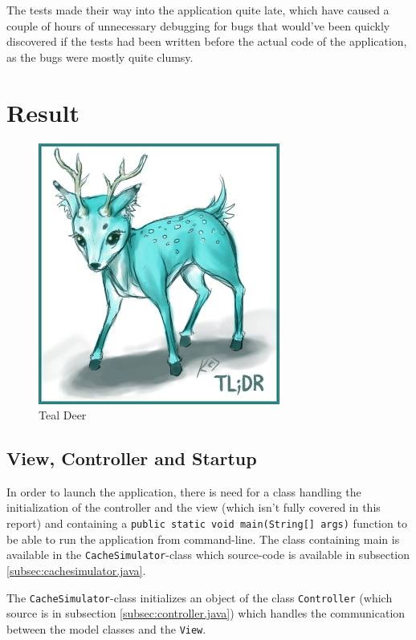 \documentclass[a4paper]{scrreprt}
\begin{document}
The tests made their way into the application quite late, which have caused a couple of hours of unnecessary debugging for bugs that would've been quickly discovered if the tests had been written before the actual code of the application, as the bugs were mostly quite clumsy.

\chapter{Result}
\label{sec:result}

\begin{figure}[h]
  \begin{center}
    \includegraphics[scale=.5]{tldr.jpg}
    \caption{Teal Deer}
    \label{fig:sd}
  \end{center}
\end{figure}

\section{View, Controller and Startup}
\label{sec:sup}

In order to launch the application, there is need for a class handling the initialization of the controller and the view (which isn't fully covered in this report) and containing a \texttt{public static void main(String[] args)} function to be able to run the application from command-line. The class containing main is available in the \texttt{CacheSimulator}-class which source-code is available in subsection \ref{subsec:cachesimulator.java}.

The \texttt{CacheSimulator}-class initializes an object of the class \texttt{Controller} (which source is in subsection \ref{subsec:controller.java}) which handles the communication between the model classes and the \texttt{View}.
\end{document}
